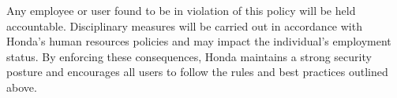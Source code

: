 Any employee or user found to be in violation of this policy will be held accountable. Disciplinary measures will be carried out in accordance with Honda's human resources policies and may impact the individual's employment status. By enforcing these consequences, Honda maintains a strong security posture and encourages all users to follow the rules and best practices outlined above.


